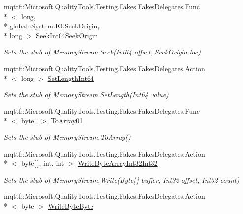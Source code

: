 \begin{DoxyCompactItemize}
mqttf\-::\-Microsoft.\-Quality\-Tools.\-Testing.\-Fakes.\-Fakes\-Delegates.\-Func\\*
$<$ long, \\*
global\-::\-System.\-I\-O.\-Seek\-Origin, \\*
long $>$ \hyperlink{class_system_1_1_i_o_1_1_fakes_1_1_stub_memory_stream_aef1e453d44e9b3bd179a2c5610452beb}{Seek\-Int64\-Seek\-Origin}
\begin{DoxyCompactList}\small\item\em Sets the stub of Memory\-Stream.\-Seek(\-Int64 offset, Seek\-Origin loc)\end{DoxyCompactList}\item 
mqttf\-::\-Microsoft.\-Quality\-Tools.\-Testing.\-Fakes.\-Fakes\-Delegates.\-Action\\*
$<$ long $>$ \hyperlink{class_system_1_1_i_o_1_1_fakes_1_1_stub_memory_stream_aa81a2f53f351a78d2e134050667ccd32}{Set\-Length\-Int64}
\begin{DoxyCompactList}\small\item\em Sets the stub of Memory\-Stream.\-Set\-Length(\-Int64 value)\end{DoxyCompactList}\item 
mqttf\-::\-Microsoft.\-Quality\-Tools.\-Testing.\-Fakes.\-Fakes\-Delegates.\-Func\\*
$<$ byte\mbox{[}$\,$\mbox{]}$>$ \hyperlink{class_system_1_1_i_o_1_1_fakes_1_1_stub_memory_stream_afebb7b674b5fa0298cd17fa27f8d3781}{To\-Array01}
\begin{DoxyCompactList}\small\item\em Sets the stub of Memory\-Stream.\-To\-Array()\end{DoxyCompactList}\item 
mqttf\-::\-Microsoft.\-Quality\-Tools.\-Testing.\-Fakes.\-Fakes\-Delegates.\-Action\\*
$<$ byte\mbox{[}$\,$\mbox{]}, int, int $>$ \hyperlink{class_system_1_1_i_o_1_1_fakes_1_1_stub_memory_stream_a35b65955861bd339c5406760107ad750}{Write\-Byte\-Array\-Int32\-Int32}
\begin{DoxyCompactList}\small\item\em Sets the stub of Memory\-Stream.\-Write(\-Byte\mbox{[}$\,$\mbox{]} buffer, Int32 offset, Int32 count)\end{DoxyCompactList}\item 
mqttf\-::\-Microsoft.\-Quality\-Tools.\-Testing.\-Fakes.\-Fakes\-Delegates.\-Action\\*
$<$ byte $>$ \hyperlink{class_system_1_1_i_o_1_1_fakes_1_1_stub_memory_stream_a8d2d4181be55765c15bfa8a1bceb0f44}{Write\-Byte\-Byte}

\end{DoxyCompactItemize}
